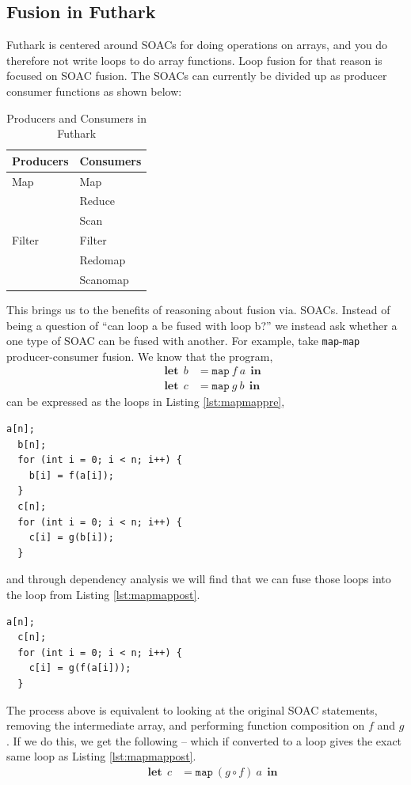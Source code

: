\documentclass[11pt]{article}
\newcommand\lett{\phantom{-}\:\:\mathbf{let}\:\:}
\newcommand\inn{\:\:\mathbf{in}\:\:}
\begin{document}
\subsection{Fusion in Futhark}
Futhark is centered around SOACs for doing operations on arrays, and you do therefore not write loops to do array functions. Loop fusion for that reason is focused on SOAC fusion. The SOACs can currently be divided up as producer consumer functions as shown below:
\begin{table}[hb!]
\centering
\caption{Producers and Consumers in Futhark}
\label{my-label}
\begin{tabular}{|l|l|}
\hline
\textbf{Producers} & \textbf{Consumers} \\ \hline
Map                & Map                \\ \hline
                   & Reduce             \\ \hline
                   & Scan               \\ \hline
Filter             & Filter             \\ \hline
                   & Redomap            \\ \hline
                   & Scanomap           \\ \hline
\end{tabular}
\end{table}

This brings us to the benefits of reasoning about fusion via. SOACs. Instead of being a question of ``can loop a be fused with loop b?'' we instead ask whether a one type of SOAC can
 be fused with another. For example, take \texttt{map}-\texttt{map} producer-consumer fusion. We know that the program,
 \begin{align*}
   \lett b &= \mathtt{map} \: f \: a \inn \\
   \lett c &= \mathtt{map} \: g \: b \inn
 \end{align*}
can be expressed as the loops in Listing \ref{lst:mapmappre},
\begin{lstlisting}[caption=\texttt{map} and \texttt{map} as producer and consumer, label={lst:mapmappre}]
  a[n];  	  
  b[n];
  for (int i = 0; i < n; i++) {
    b[i] = f(a[i]);
  }
  c[n];
  for (int i = 0; i < n; i++) {
    c[i] = g(b[i]);
  }
\end{lstlisting}
and through dependency analysis we will find that we can fuse those loops into the loop from Listing \ref{lst:mapmappost}.
\begin{lstlisting}[caption=Loop from Listing \ref{lst:mapmappre} fused as producer and consumer, label={lst:mapmappost}]
  a[n];  	  
  c[n];
  for (int i = 0; i < n; i++) {
    c[i] = g(f(a[i]));
  }
\end{lstlisting}
The process above is equivalent to looking at the original SOAC statements, removing the intermediate array, and performing function composition on $f$ and $g$. If
 we do this, we get the following -- which if converted to a loop gives the exact same loop as Listing \ref{lst:mapmappost}.
 \begin{align*}
   \lett c &= \mathtt{map} \: (g \circ f) \: a \inn
 \end{align*}
\end{document}

